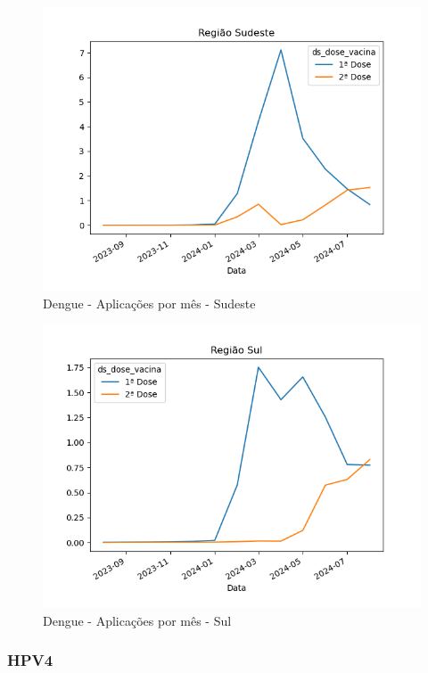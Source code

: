 \documentclass[12pt]{article}
\begin{document}
\begin{figure}[H]
    \centering
    \includegraphics[width=0.85\linewidth]{imagens/Dengue-Sudeste-Aplicacoes-mes}
    \caption{Dengue - Aplicações por mês - Sudeste}
    \label{fig:dengue-sudeste-aplicacoes-mes}
\end{figure}
\begin{figure}[H]
    \centering
    \includegraphics[width=0.85\linewidth]{imagens/Dengue-Sul-Aplicacoes-mes}
    \caption{Dengue - Aplicações por mês - Sul}
    \label{fig:dengue-sul-aplicacoes-mes}
\end{figure}

\subsubsection{HPV4}
\end{document}
